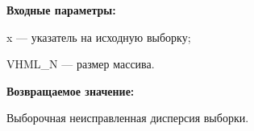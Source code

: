 \textbf{Входные параметры:}
 
x --- указатель на исходную выборку;
 
VHML\_N --- размер массива.

\textbf{Возвращаемое значение:}
 
Выборочная неисправленная дисперсия выборки.